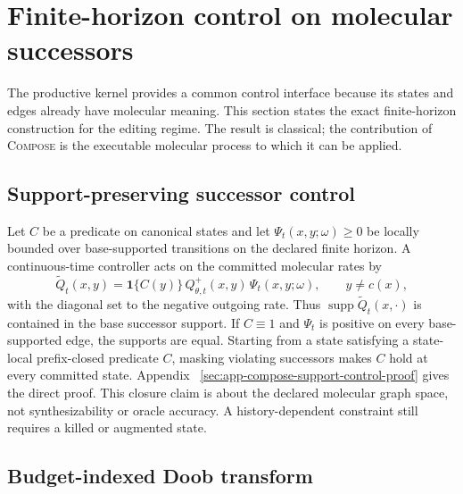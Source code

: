 \documentclass[10pt,letterpaper]{article}
\newcommand{\method}{\textsc{Compose}\xspace}
\begin{document}
\section{Finite-horizon control on molecular successors}
\label{sec:finite-control}

The productive kernel provides a common control interface because its states
and edges already have molecular meaning. This section states the exact
finite-horizon construction for the editing regime. The result is classical;
the contribution of \method is the executable molecular process to which it
can be applied.

\subsection{Support-preserving successor control}
\label{sec:support-control}

Let $C$ be a predicate on canonical states and let
$\Psi_t(x,y;\omega)\geq0$ be locally bounded over base-supported transitions
on the declared finite horizon. A continuous-time controller acts on the
committed molecular rates by
\begin{equation}
  \widetilde Q_t(x,y)
  =
  \mathbf 1\{C(y)\}\,
  Q_{\theta,t}^{+}(x,y)\,
  \Psi_t(x,y;\omega),
  \qquad y\neq c(x),
  \label{eq:successor-control-law}
\end{equation}
with the diagonal set to the negative outgoing rate. Thus
$\operatorname{supp}\widetilde Q_t(x,\cdot)$ is contained in the base
successor support. If $C\equiv1$ and $\Psi_t$ is positive on every
base-supported edge, the supports are equal. Starting from a state satisfying
a state-local prefix-closed predicate $C$, masking violating successors makes
$C$ hold at every committed state. Appendix
~\ref{sec:app-compose-support-control-proof} gives the direct proof. This
closure claim is about the declared molecular graph space, not
synthesizability or oracle accuracy. A history-dependent constraint still
requires a killed or augmented state.

\subsection{Budget-indexed Doob transform}
\end{document}
